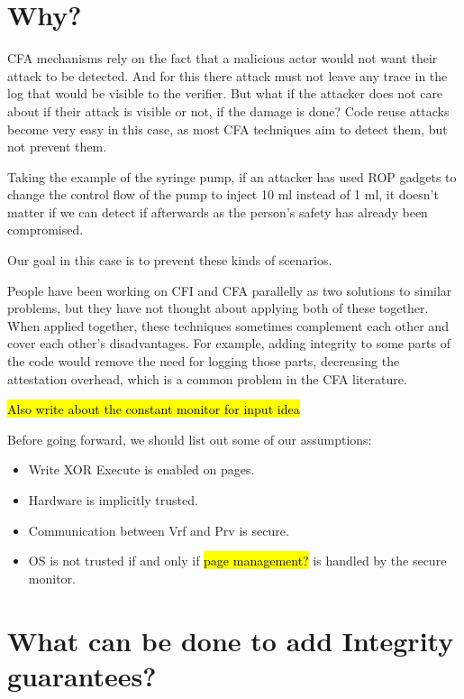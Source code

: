 \documentclass[a4paper, nobind]{templates/ociamthesis}
\providecommand{\tightlist}{%
  \setlength{\itemsep}{0pt}\setlength{\parskip}{0pt}}
\begin{document}
\minitoc 

\section{Why?}\label{why-1}

CFA mechanisms rely on the fact that a malicious actor would not want their attack
to be detected. And for this there attack must not leave any trace in the log that
would be visible to the verifier. But what if the attacker does not care about if
their attack is visible or not, if the damage is done? Code reuse attacks become
very easy in this case, as most CFA techniques aim to detect them, but not prevent them.

Taking the example of the syringe pump, if an attacker has used ROP gadgets to
change the control flow of the pump to inject 10 ml instead of 1 ml, it doesn't
matter if we can detect if afterwards as the person's safety has already been compromised.

Our goal in this case is to prevent these kinds of scenarios.

People have been working on CFI and CFA parallelly as two solutions to similar
problems, but they have not thought about applying both of these together.
When applied together, these techniques sometimes complement each other and cover
each other's disadvantages. For example, adding integrity to some parts of the
code would remove the need for logging those parts, decreasing the attestation
overhead, which is a common problem in the CFA literature.

\hl{Also write about the constant monitor for input idea}

Before going forward, we should list out some of our assumptions:

\begin{itemize}
\tightlist
\item
  Write XOR Execute is enabled on pages.
\item
  Hardware is implicitly trusted.
\item
  Communication between Vrf and Prv is secure.
\item
  OS is not trusted if and only if \hl{page management?} is handled
  by the secure monitor.
\end{itemize}

\section{What can be done to add Integrity guarantees?}\label{what-can-be-done-to-add-integrity-guarantees}
\end{document}
